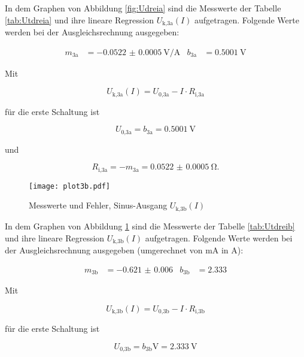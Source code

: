   In dem Graphen von Abbildung \ref{fig:Udreia} sind die Messwerte der Tabelle
  \ref{tab:Utdreia} und ihre lineare Regression
  $U_\text{k,3a}(I)$ aufgetragen.
  Folgende Werte werden bei der Ausgleichsrechnung ausgegeben:

\FloatBarrier

  \begin{align}
    m_\text{3a} & = \SI{-0.0522(5)}{\V\per\A} & b_\text{3a} & = \SI{0.5001}{\V}
  \end{align}

  Mit

  \begin{equation}
    U_\text{k,3a}(I) = U_\text{0,3a} - I \cdot R_\text{i,3a}
  \end{equation}

  für die erste Schaltung ist

  \begin{equation}
    U_\text{0,3a} = b_\text{3a} = \SI{0.5001}{\V}
  \end{equation}

  und

  \begin{equation}
    R_\text{i,3a} = -m_\text{3a} = \SI{0.0522(5)}{\ohm}.
  \end{equation}

  \begin{figure}[h]
    \centering
    \texttt{[image: plot3b.pdf]}
    \caption{Messwerte und Fehler, Sinus-Ausgang $U_\text{k,3b}(I)$}
    \label{fig:Udreib}
  \end{figure}

  In dem Graphen von Abbildung \ref{fig:Udreib} sind die Messwerte der Tabelle
  \ref{tab:Utdreib} und ihre lineare Regression
  $U_\text{k,3b}(I)$ aufgetragen.
  Folgende Werte werden bei der Ausgleichsrechnung ausgegeben (umgerechnet von
  \si{\milli\A} in \si{\A}):

  \begin{align}
    m_\text{3b} & = \num{-0.621(6)} & b_\text{3b} & = 2.333
  \end{align}

  Mit

  \begin{equation}
    U_\text{k,3b}(I) = U_\text{0,3b} - I \cdot R_\text{i,3b}
  \end{equation}

  für die erste Schaltung ist

  \begin{equation}
    U_\text{0,3b} = b_\text{3b} \si{\V} = \SI{2.333}{\V}
  \end{equation}

